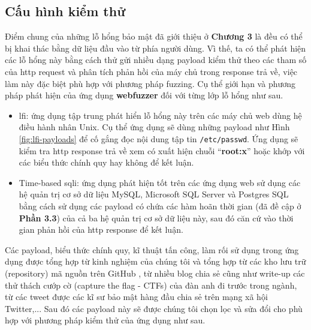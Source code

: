 \subsection{Cấu hình kiểm thử}
Điểm chung của những lỗ hổng bảo mật đã giới thiệu ở \textbf{Chương 3} là đều có thể bị khai thác bằng dữ liệu đầu vào từ phía người dùng. Vì thế, ta có thể phát hiện các lỗ hổng này bằng cách thử gửi nhiều dạng payload kiểm thử theo các tham số của \acrshort{http} request và phân tích phản hồi của máy chủ trong response trả về, việc làm này đặc biệt phù hợp với phương pháp fuzzing. Cụ thể giới hạn và phương pháp phát hiện của ứng dụng \textbf{webfuzzer} đối với từng lớp lỗ hổng như sau.
\begin{itemize}
    \item \acrshort{lfi}: ứng dụng tập trung phát hiển lỗ hổng này trên các máy chủ web dùng hệ điều hành nhân Unix. Cụ thể ứng dụng sẽ dùng những payload như Hình \ref{fig:lfi-payloads} để cố gắng đọc nội dung tập tin \texttt{/etc/passwd}. Ứng dụng sẽ kiểm tra \acrshort{http} response trả về xem có xuất hiện chuỗi ``\textbf{root:x}'' hoặc khớp với các biểu thức chính quy hay không để kết luận.
    \item Time-based \acrshort{sqli}: ứng dụng phát hiện tốt trên các ứng dụng web sử dụng các hệ quản trị cơ sở dữ liệu MySQL, Microsoft SQL Server và Postgres SQL bằng cách sử dụng các payload có chứa các hàm hoãn thời gian (đã đề cập ở \textbf{Phần 3.3}) của cả ba hệ quản trị cơ sở dữ liệu này, sau đó căn cứ vào thời gian phản hồi của \acrshort{http} response để kết luận.
\end{itemize}
Các payload, biểu thức chính quy, kĩ thuật tấn công, làm rối sử dụng trong ứng dụng được tổng hợp từ kinh nghiệm của chúng tôi và tổng hợp từ các kho lưu trữ (repository) mã nguồn trên GitHub \parencite{seclist-fuzzing,0verpwn-fuzzing}, từ nhiều blog chia sẻ cũng như write-up các thử thách cướp cờ (capture the flag - CTFs) của đàn anh đi trước trong ngành, từ các tweet được các kĩ sư bảo mật hàng đầu chia sẻ trên mạng xã hội Twitter,... Sau đó các payload này sẽ được chúng tôi chọn lọc và sửa đổi cho phù hợp với phương pháp kiểm thử của ứng dụng như sau.
